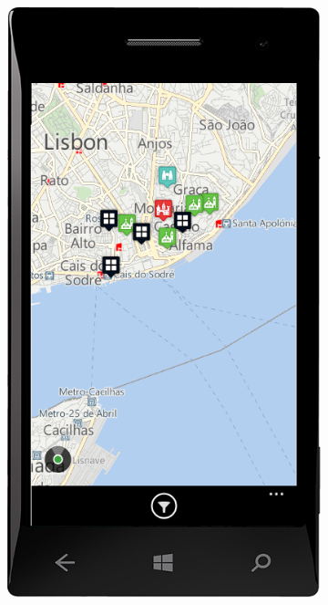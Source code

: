 \documentclass[a4paper]{book}
\begin{document}
\begin{figure}[H]
\begin{subfigure}{0.3\textwidth}
				\includegraphics[width=\textwidth]{screenshots/mobile/mobile9.png}
				\caption{\label{subfig:mobile_map}}
			\end{subfigure}
			\hfill
			\begin{subfigure}{0.3\textwidth}

\end{subfigure}
\end{figure}
\end{document}
